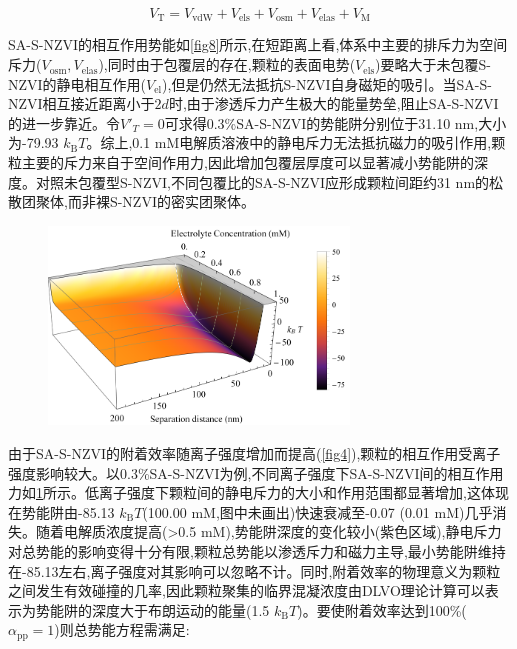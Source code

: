 \begin{equation}
   V_\mathrm{T}=V_\mathrm{vdW}+V_\mathrm{els}+V_\mathrm{osm}+V_\mathrm{elas}+V_\mathrm{M} 
\end{equation}

SA-S-NZVI的相互作用势能如\cref{fig8}所示,在短距离上看,体系中主要的排斥力为空间斥力($V_\mathrm{osm},V_\mathrm{elas}$),同时由于包覆层的存在,颗粒的表面电势($V_\mathrm{els}$)要略大于未包覆S-NZVI的静电相互作用($V_\mathrm{el}$),但是仍然无法抵抗S-NZVI自身磁矩的吸引。当SA-S-NZVI相互接近距离小于$2d$时,由于渗透斥力产生极大的能量势垒,阻止SA-S-NZVI的进一步靠近。令$V'_T=0$可求得0.3\%SA-S-NZVI的势能阱分别位于31.10 nm,大小为-79.93 $k_\mathrm{B}T$。综上,0.1 mM电解质溶液中的静电斥力无法抵抗磁力的吸引作用,颗粒主要的斥力来自于空间作用力,因此增加包覆层厚度可以显著减小势能阱的深度。对照未包覆型S-NZVI,不同包覆比的SA-S-NZVI应形成颗粒间距约31 nm的松散团聚体,而非裸S-NZVI的密实团聚体。

\begin{figure}[h]
    \centering
    \includegraphics[width=8cm]{figs/fig11.pdf}
    \label{fig11}
\end{figure}

由于SA-S-NZVI的附着效率随离子强度增加而提高(\cref{fig4}),颗粒的相互作用受离子强度影响较大。以0.3\%SA-S-NZVI为例,不同离子强度下SA-S-NZVI间的相互作用力如\cref{fig11}所示。低离子强度下颗粒间的静电斥力的大小和作用范围都显著增加,这体现在势能阱由-85.13 $k_\mathrm{B}T$(100.00 mM,图中未画出)快速衰减至-0.07 (0.01 mM)几乎消失。随着电解质浓度提高(>0.5 mM),势能阱深度的变化较小(紫色区域),静电斥力对总势能的影响变得十分有限,颗粒总势能以渗透斥力和磁力主导,最小势能阱维持在-85.13左右,离子强度对其影响可以忽略不计。同时,附着效率的物理意义为颗粒之间发生有效碰撞的几率,因此颗粒聚集的临界混凝浓度由DLVO理论计算可以表示为势能阱的深度大于布朗运动的能量(1.5 $k_\mathrm{B}T$)。要使附着效率达到100\%($\alpha_\mathrm{pp}=1$)则总势能方程需满足:


